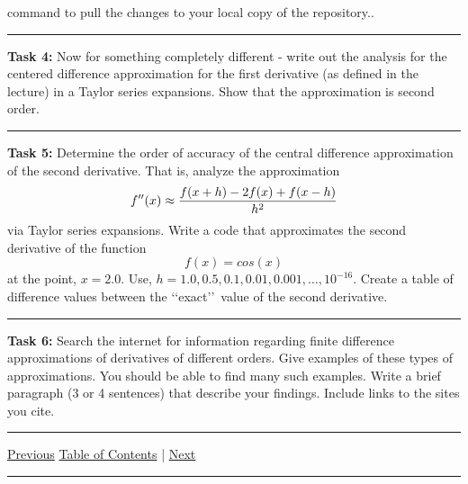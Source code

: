 \documentclass[10pt,fleqn]{article}
\begin{document}
\begin{trivlist}
\begin{verbatim}
        \end{verbatim}
        command to pull the changes to your local copy of the repository..
\vskip0.1in\hrule\vskip0.1in \noindent
  \item[\bf Task 4:] Now for something completely different - write out the
        analysis for the centered difference approximation for the first
        derivative (as defined in the lecture) in a Taylor series expansions.
        Show that the approximation is second order.
\vskip0.1in\hrule\vskip0.1in \noindent
  \item[\bf Task 5:] Determine the order of accuracy of the central difference
        approximation of the second derivative. That is, analyze the
        approximation
        \[
          f''(x) \approx {{f(x+h) - 2 f(x) + f(x-h)}\over{h^2}}
        \]
        via Taylor series expansions. Write a code that approximates the second
        derivative of the function
        \[
          f(x) = cos(x)
        \] 
        at the point, \(x=2.0\). Use,
        \(h=1.0,0.5,0.1,0.01,0.001,\ldots,10^{-16}\). Create a table of
        difference values between the \lq\lq exact\rq\rq\ value of the second
        derivative.
\vskip0.1in\hrule\vskip0.1in \noindent
  \item[\bf Task 6:] Search the internet for information regarding finite
        difference approximations of derivatives of different orders. Give
        examples of these types of approximations. You should be able to find
        many such examples. Write a brief paragraph (3 or 4 sentences) that
        describe your findings. Include links to the sites you cite.
\end{trivlist}
\vskip0.1in\hrule\vskip0.1in \noindent
  \href{../../tasksheet_01/html/tasksheet_01.html}{Previous}
  \href{../../toc/md/tasksheet_toc.md}{Table of Contents} |
  \href{../../tasksheet_03/html/tasksheet_03.html}{Next}
\vskip0.1in\hrule\vskip0.1in \noindent
\end{document}
